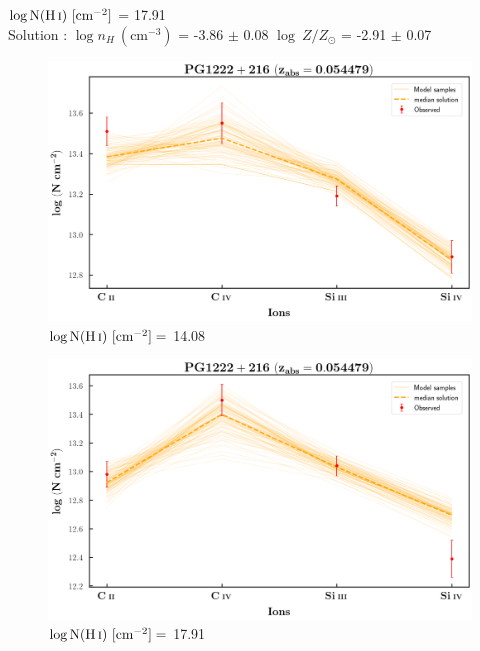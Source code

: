   $\log \text{N}(\ion{H}{i}) \ [\text{cm}^{-2}]$ = 17.91   \\ 
  Solution : $\log n_H \ (\text{cm}^{-3})$ = -3.86 $\pm$ 0.08 \hspace{10mm} $\log \ Z/Z_\odot$ = -2.91 $\pm$ 0.07 \newline  
  
  \newpage
  
  \begin{figure}[!h]
      \centering
      \includegraphics[width=0.85\linewidth]{Ionisation-Modelling-Plots/pg1222-z=0.054479-compI_logZ=-1.png}
      \caption{$\log \text{N}(\ion{H}{i}) \ [\text{cm}^{-2}]=$ 14.08}
  \end{figure}
  
  \begin{figure}[!b]
      \centering
      \includegraphics[width=0.85\linewidth]{Ionisation-Modelling-Plots/pg1222-z=0.054479-compII_logZ=-1.png}
      \caption{$\log \text{N}(\ion{H}{i}) \ [\text{cm}^{-2}]=$ 17.91}
  \end{figure}
  
  
  \newpage
  
